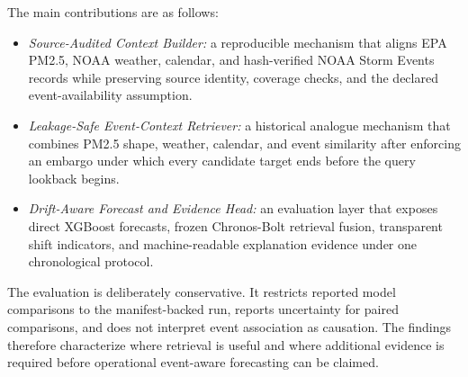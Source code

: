The main contributions are as follows:
\begin{itemize}
    \item \textit{Source-Audited Context Builder:} a reproducible mechanism
    that aligns EPA PM2.5, NOAA weather, calendar, and hash-verified NOAA Storm
    Events records while preserving source identity, coverage checks, and the
    declared event-availability assumption.
    \item \textit{Leakage-Safe Event-Context Retriever:} a historical analogue
    mechanism that combines PM2.5 shape, weather, calendar, and event
    similarity after enforcing an embargo under which every candidate target
    ends before the query lookback begins.
    \item \textit{Drift-Aware Forecast and Evidence Head:} an evaluation layer
    that exposes direct XGBoost forecasts, frozen Chronos-Bolt retrieval fusion,
    transparent shift indicators, and machine-readable explanation evidence
    under one chronological protocol.
\end{itemize}

The evaluation is deliberately conservative. It restricts reported model
comparisons to the manifest-backed run, reports uncertainty for paired
comparisons, and does not interpret event association as causation. The findings
therefore characterize where retrieval is useful and where additional evidence
is required before operational event-aware forecasting can be claimed.

